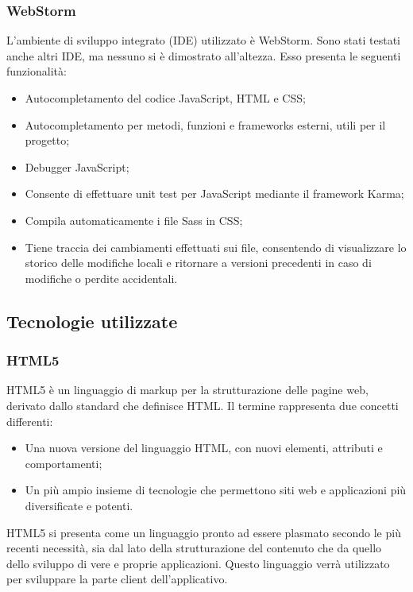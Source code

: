 \subsubsection{WebStorm}
L'ambiente di sviluppo integrato (IDE) utilizzato è WebStorm. Sono stati testati anche altri IDE, ma nessuno si è dimostrato all'altezza. Esso presenta le seguenti funzionalità:
\begin{itemize}
\item
Autocompletamento del codice JavaScript, HTML e CSS;
\item
Autocompletamento per metodi, funzioni e frameworks esterni, utili per il progetto;
\item
Debugger JavaScript;
\item
Consente di effettuare unit test per JavaScript mediante il framework Karma;
\item
Compila automaticamente i file Sass in CSS;
\item
Tiene traccia dei cambiamenti effettuati sui file, consentendo di visualizzare lo storico delle modifiche locali e ritornare a versioni precedenti in caso di modifiche o perdite accidentali.
\end{itemize}


\subsection{Tecnologie utilizzate}
\subsubsection{HTML5}
HTML5 è un linguaggio di markup per la strutturazione delle pagine web, derivato dallo standard che definisce HTML.
Il termine rappresenta due concetti differenti:
\begin{itemize}
		\item
			Una nuova versione del linguaggio HTML, con nuovi elementi, attributi e comportamenti;
		\item
			Un più ampio insieme di tecnologie che permettono siti web e applicazioni più diversificate e potenti.
\end{itemize}
HTML5 si presenta come un linguaggio pronto ad essere plasmato secondo le più recenti necessità, sia dal lato della strutturazione del contenuto che da quello dello sviluppo di vere e proprie applicazioni.
Questo linguaggio verrà utilizzato per sviluppare la parte client dell'applicativo.


